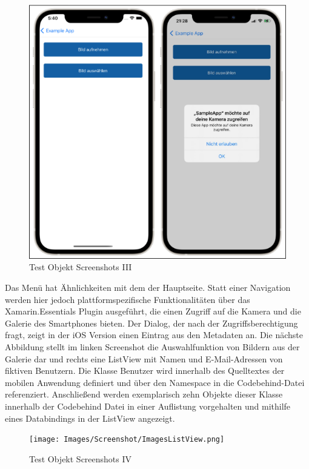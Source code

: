 
\begin{figure}[!ht]
 \includegraphics[width=\textwidth,keepaspectratio]{Images/Screenshot/Permissions.png}
 \caption{Test Objekt Screenshots III}
 \label{fig:TestObjectIII}
\end{figure}
Das Menü hat Ähnlichkeiten mit dem der Hauptseite.  Statt einer Navigation werden hier jedoch plattformspezifische Funktionalitäten über das Xamarin.Essentials Plugin ausgeführt, die einen Zugriff auf die Kamera und die Galerie des Smartphones bieten.  Der Dialog,  der nach der Zugriffsberechtigung fragt, zeigt in der iOS Version einen Eintrag aus den Metadaten an.
Die nächste Abbildung stellt im linken Screenshot die Auswahlfunktion von Bildern aus der Galerie dar und rechts eine ListView mit Namen und E-Mail-Adressen von fiktiven Benutzern.  
Die Klasse \glq Benutzer\grq{} wird innerhalb des Quelltextes der mobilen Anwendung definiert und über den Namespace in die Codebehind-Datei referenziert.  Anschließend werden exemplarisch zehn Objekte dieser Klasse innerhalb der Codebehind Datei in einer Auflistung vorgehalten und mithilfe eines Databindings in der ListView angezeigt. 
 
\begin{figure}[!ht]
 \texttt{[image: Images/Screenshot/ImagesListView.png]}
 \caption{Test Objekt Screenshots IV}
 \label{fig:TestObjectIV}
\end{figure}


